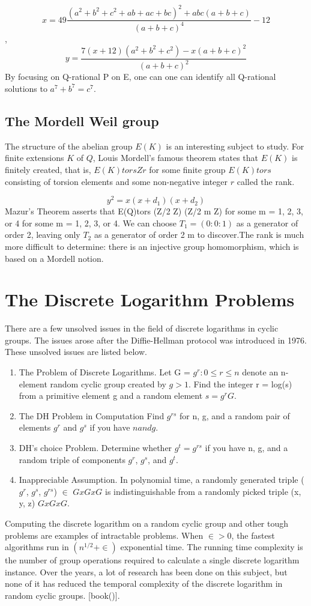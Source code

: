 $$x=49\frac{(a^{2}+b^{2}+c^{2}+ab+ac+bc)^{2}+abc(a+b+c)}{(a+b+c)^{4}}-12$$,
$$y=\frac{7(x+12)(a^{2}+b^{2}+c^{2})-x(a+b+c)^{2}}{(a+b+c)^{2}}$$
By focusing on Q-rational P on E, one can one can identify all Q-rational solutions to $a^{7} + b^{7} = c^{7}$.

\subsection{The Mordell Weil group}
The structure of the abelian group $E(K)$ is an interesting subject to study. For finite extensions $K$ of $Q$, Louis Mordell's famous theorem states that $E(K)$ is finitely created, that is, $E(K)tors Z r$ for some finite group $E(K)tors$ consisting of torsion elements and some non-negative integer $r$ called the rank.

$$y^{2}=x(x+d_{1})(x+d_{2})$$
Mazur's Theorem asserts that E(Q)tors (Z/2 Z) (Z/2 m Z) for some m = 1, 2, 3, or 4 for some m = 1, 2, 3, or 4. We can choose $T_{1} = (0 :0: 1)$ as a generator of order 2, leaving only $T_{2}$ as a generator of order 2 m to discover.The rank is much more difficult to determine: there is an injective group homomorphism, which is based on a Mordell notion.

\section{The Discrete Logarithm Problems}
There are a few unsolved issues in the field of discrete logarithms in cyclic groups. The issues arose after the Diffie-Hellman protocol was introduced in 1976. These unsolved issues are listed below.
\begin{enumerate}
	\item The Problem of Discrete Logarithms. Let G = ${g^{r}:0 \leq r \le n}$ denote an n-element random cyclic group created by $g > 1$. Find the integer r = log(s) from a primitive element g and a random element $s = g^{r} G$.
	\item The DH Problem in Computation Find $g^{rs}$ for n, g, and a random pair of elements $g^{r}$ and $g^{s}$ if you have $n and g$.
	\item DH's choice Problem. Determine whether $g^{t} = g^{rs}$ if you have n, g, and a random triple of components $g^{r}$, $g^{s}$, and $g^{t}$.
	\item Inappreciable Assumption. In polynomial time, a randomly generated triple ($g^{r}$, $g^{s}$, $g^{rs}$) $\in$ $GxGxG$ is indistinguishable from a randomly picked triple (x, y, z) $GxGxG$.
\end{enumerate}
Computing the discrete logarithm on a random cyclic group and other tough problems are examples of intractable problems. When $\in > 0$, the fastest algorithms run in $(n^{1/2}+\in)$ exponential time. The running time complexity is the number of group operations required to calculate a single discrete logarithm instance. Over the years, a lot of research has been done on this subject, but none of it has reduced the temporal complexity of the discrete logarithm in random cyclic groups. [book()].
